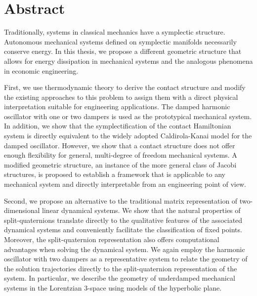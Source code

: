 \chapter*{Abstract}%

Traditionally, systems in classical mechanics have a symplectic structure. Autonomous mechanical systems defined on symplectic manifolds necessarily conserve energy.
In this thesis, we propose a different geometric structure that allows for energy dissipation in mechanical systems and the analogous phenomena in economic engineering. 

First, we use thermodynamic theory to derive the contact structure and modify the existing approaches to this problem to assign them with a direct physical interpretation suitable for engineering applications. 
The damped harmonic oscillator with one or two dampers is used as the prototypical mechanical system. 
In addition, we show that the symplectification of the contact Hamiltonian system is directly equivalent to the widely adopted Caldirola-Kanai model for the damped oscillator.
However, we show that a contact structure does not offer enough flexibility for general, multi-degree of freedom mechanical systems.
A modified geometric structure, an instance of the more general class of Jacobi structures, is proposed to establish a framework that is applicable to any mechanical system and directly interpretable from an engineering point of view.

Second, we propose an alternative to the traditional matrix representation of two-dimensional linear dynamical systems. 
We show that the natural properties of split-quaternions translate directly to the qualitative features of the associated dynamical systems and conveniently facilitate the classification of fixed points. Moreover, the split-quaternion representation also offers computational advantages when solving the dynamical system.
We again employ the harmonic oscillator with two dampers as a representative system to relate the geometry of the solution trajectories directly to the split-quaternion representation of the system. In particular, we describe the geometry of underdamped mechanical systems in the Lorentzian 3-space using models of the hyperbolic plane.

 

